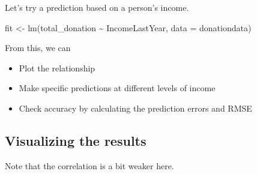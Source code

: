 \documentclass[
  letterpaper,
  DIV=11,
  numbers=noendperiod]{scrreprt}
\newenvironment{Shaded}{\begin{snugshade}}{\end{snugshade}}
\newcommand{\AttributeTok}[1]{\textcolor[rgb]{0.40,0.45,0.13}{#1}}
\newcommand{\DecValTok}[1]{\textcolor[rgb]{0.68,0.00,0.00}{#1}}
\newcommand{\FunctionTok}[1]{\textcolor[rgb]{0.28,0.35,0.67}{#1}}
\newcommand{\NormalTok}[1]{\textcolor[rgb]{0.00,0.23,0.31}{#1}}
\newcommand{\OtherTok}[1]{\textcolor[rgb]{0.00,0.23,0.31}{#1}}
\newcommand{\SpecialCharTok}[1]{\textcolor[rgb]{0.37,0.37,0.37}{#1}}
\newcommand{\StringTok}[1]{\textcolor[rgb]{0.13,0.47,0.30}{#1}}
\providecommand{\tightlist}{%
  \setlength{\itemsep}{0pt}\setlength{\parskip}{0pt}}\usepackage{longtable,booktabs,array}
\begin{document}
Let's try a prediction based on a person's income.

\begin{Shaded}
\begin{Highlighting}[]
\NormalTok{fit }\OtherTok{\textless{}{-}} \FunctionTok{lm}\NormalTok{(total\_donation }\SpecialCharTok{\textasciitilde{}}\NormalTok{ IncomeLastYear, }\AttributeTok{data =}\NormalTok{ donationdata)}
\end{Highlighting}
\end{Shaded}

From this, we can

\begin{itemize}
\tightlist
\item
  Plot the relationship
\item
  Make specific predictions at different levels of income
\item
  Check accuracy by calculating the prediction errors and RMSE
\end{itemize}

\hypertarget{visualizing-the-results-1}{%
\subsection{Visualizing the results}\label{visualizing-the-results-1}}

Note that the correlation is a bit weaker here.

\begin{Shaded}
\end{Shaded}
\end{document}
